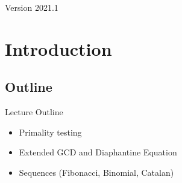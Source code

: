 \documentclass[aspectratio=169]{beamer}
\subtitle[Week 8: Mathematics]{Week 8 - Mathematics}
\date[]{{\smaller(last updated: \today)}}
\begin{document}
\begin{CJK}{UTF8}{ipxm}

\begin{frame}
\maketitle
\vfill

\hfill Version 2021.1
\end{frame}

\section{Introduction}

\subsection{Outline}
\begin{frame}{Lecture Outline}

  \begin{itemize}
    \item Primality testing
    \item Extended GCD and Diaphantine Equation
    \item Sequences (Fibonacci, Binomial, Catalan)
  \end{itemize}
\end{frame}







\end{CJK}
\end{document}
